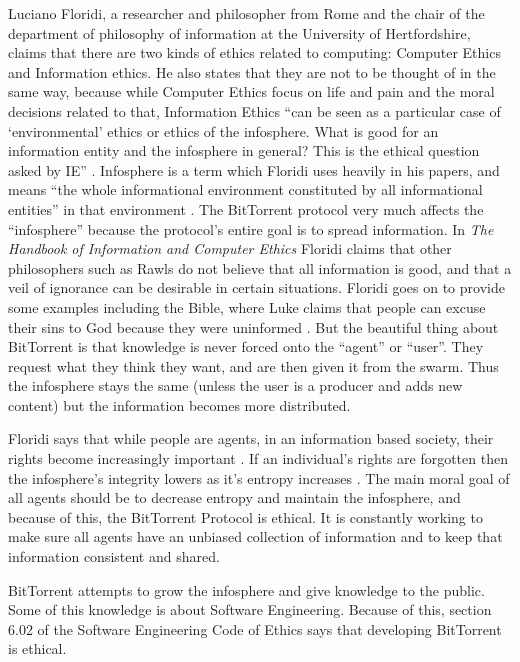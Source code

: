 \documentclass[11pt]{article}
\begin{document}
\begin{multicols}{2}
Luciano Floridi, a researcher and philosopher from Rome and the chair of the department of philosophy of information at the University of Hertfordshire, claims that there are two kinds of ethics related to computing: Computer Ethics and Information ethics. He also states that they are not to be thought of in the same way, because while Computer Ethics focus on life and pain and the moral decisions related to that, Information Ethics ``can be seen as a particular case of `environmental' ethics or ethics of the infosphere. What is good for an information entity and the infosphere in general? This is the ethical question asked by IE'' \cite[1]{floridiInfo}. Infosphere is a term which Floridi uses heavily in his papers, and means ``the whole informational environment constituted by all informational entities'' in that environment \cite[3]{ethicshandbook}. The BitTorrent protocol very much affects the ``infosphere'' because the protocol's entire goal is to spread information. In \textit{The Handbook of Information and Computer Ethics} Floridi claims that other philosophers such as Rawls do not believe that all information is good, and that a veil of ignorance can be desirable in certain situations. Floridi goes on to provide some examples including the Bible, where Luke claims that people can excuse their sins to God because they were uninformed \cite[6]{ethicshandbook}. But the beautiful thing about BitTorrent is that knowledge is never forced onto the ``agent'' or ``user''. They request what they think they want, and are then given it from the swarm. Thus the infosphere stays the same (unless the user is a producer and adds new content) but the information becomes more distributed.

Floridi says that while people are agents, in an information based society, their rights become increasingly important \cite[4]{floridiInfo}. If an individual's rights are forgotten then the infosphere's integrity lowers as it's entropy increases \cite[10]{floridiInfo}. The main moral goal of all agents should be to decrease entropy and maintain the infosphere, and because of this, the BitTorrent Protocol is ethical. It is constantly working to make sure all agents have an unbiased collection of information and to keep that information consistent and shared.

BitTorrent attempts to grow the infosphere and give knowledge to the public. Some of this knowledge is about Software Engineering. Because of this, section 6.02 of the Software Engineering Code of Ethics says that developing BitTorrent is ethical.


\end{multicols}
\end{document}
